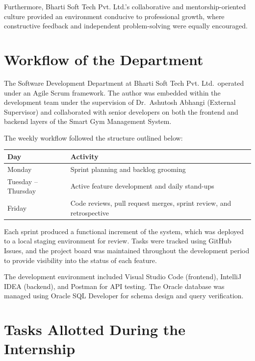\documentclass[
  12pt,
  a4paperpaper,
]{report}
\begin{document}
Furthermore, Bharti Soft Tech Pvt. Ltd.'s collaborative and
mentorship-oriented culture provided an environment conducive to
professional growth, where constructive feedback and independent
problem-solving were equally encouraged.


\section{Workflow of the Department}\label{workflow-of-the-department}

The Software Development Department at Bharti Soft Tech Pvt.
Ltd.~operated under an Agile Scrum framework. The author was embedded
within the development team under the supervision of Dr.~Ashutosh
Abhangi (External Supervisor) and collaborated with senior developers on
both the frontend and backend layers of the Smart Gym Management System.

The weekly workflow followed the structure outlined below:

\noindent\begin{tabularx}{\textwidth}{|p{3.5cm}|X|}
\hline
\textbf{Day} & \textbf{Activity} \\
\hline

Monday & Sprint planning and backlog grooming \\[4pt]
\hline
Tuesday -- Thursday & Active feature development and daily stand-ups \\[4pt]
\hline
Friday & Code reviews, pull request merges, sprint review, and retrospective \\
\hline
\end{tabularx}

\medskip

Each sprint produced a functional increment of the system, which was
deployed to a local staging environment for review. Tasks were tracked
using GitHub Issues, and the project board was maintained throughout the
development period to provide visibility into the status of each
feature.

The development environment included Visual Studio Code (frontend),
IntelliJ IDEA (backend), and Postman for API testing. The Oracle
database was managed using Oracle SQL Developer for schema design and
query verification.


\section{Tasks Allotted During the
Internship}\label{tasks-allotted-during-the-internship}
\end{document}
